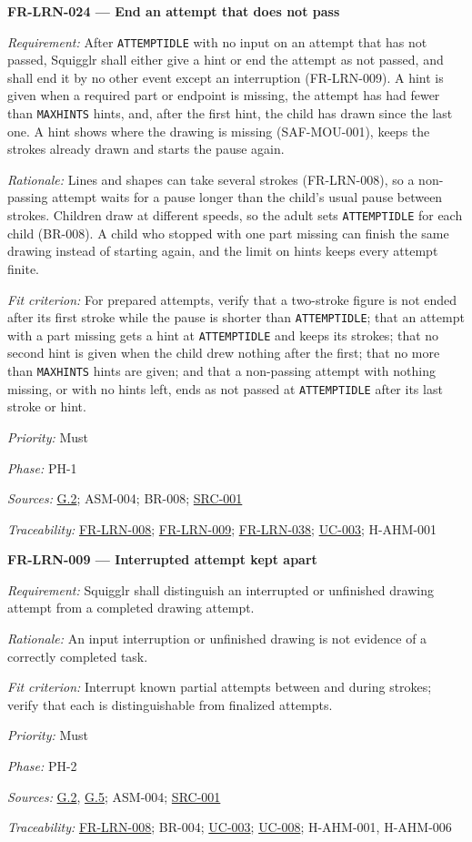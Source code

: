 \documentclass[12pt]{article}
\renewcommand{\_}{\textunderscore\allowbreak}%
\newcommand{\goalref}[1]{\hyperref[goal:#1]{G.#1}}
\newcommand{\ucref}[1]{\hyperref[uc:#1]{\mbox{UC-#1}}}
\newenvironment{srsrequirement}[2]{%
  \par\medskip\noindent\phantomsection\label{req:#1}%
  \textbf{#1 --- #2}\par\nobreak\smallskip }{\par\medskip}
\newcommand{\reqfield}[2]{\noindent\textit{#1:} #2\par}
\newcommand{\reqshall}[1]{\reqfield{Requirement}{#1}}
\newcommand{\reqrationale}[1]{\reqfield{Rationale}{#1}}
\newcommand{\reqfit}[1]{\reqfield{Fit criterion}{#1}}
\newcommand{\reqpriority}[1]{\reqfield{Priority}{#1}}
\newcommand{\reqphase}[1]{\reqfield{Phase}{#1}}
\newcommand{\reqsources}[1]{\reqfield{Sources}{#1}}
\newcommand{\reqtraces}[1]{\reqfield{Traceability}{#1}}
\newcommand{\reqref}[1]{\hyperref[req:#1]{#1}}
\newcommand{\srcref}[1]{\hyperref[src:#1]{SRC-#1}}
\providecommand{\ucref}[1]{\hyperref[uc:#1]{UC-#1}}
\begin{document}
\begin{srsrequirement}{FR-LRN-024}{End an attempt that does not pass}
  \reqshall{After \texttt{ATTEMPT\_IDLE} with no input on an attempt that has
not passed, Squigglr shall either give a hint or end the attempt as not passed,
and shall end it by no other event except an interruption (FR-LRN-009). A hint
is given when a required part or endpoint is missing, the attempt has had fewer
than \texttt{MAX\_HINTS} hints, and, after the first hint, the child has drawn
since the last one. A hint shows where the drawing is missing (SAF-MOU-001),
keeps the strokes already drawn and starts the pause again.}
\reqrationale{Lines and shapes can take several strokes (FR-LRN-008), so a
non-passing attempt waits for a pause longer than the child's usual pause
between strokes. Children draw at different speeds, so the adult sets
\texttt{ATTEMPT\_IDLE} for each child (BR-008). A child who stopped with one
part missing can finish the same drawing instead of starting again, and the
limit on hints keeps every attempt finite.} \reqfit{For prepared attempts,
verify that a two-stroke figure is not ended after its first stroke while the
pause is shorter than \texttt{ATTEMPT\_IDLE}; that an attempt with a part
missing gets a hint at \texttt{ATTEMPT\_IDLE} and keeps its strokes; that no
second hint is given when the child drew nothing after the first; that no more
than \texttt{MAX\_HINTS} hints are given; and that a non-passing attempt with
nothing missing, or with no hints left, ends as not passed at
\texttt{ATTEMPT\_IDLE} after its last stroke or hint.}
  \reqpriority{Must}
  \reqphase{PH-1}
  \reqsources{\goalref{2}; ASM-004; BR-008; \srcref{001}}
  \reqtraces{\reqref{FR-LRN-008}; \reqref{FR-LRN-009}; \reqref{FR-LRN-038};
  \ucref{003}; H-AHM-001}
\end{srsrequirement}

\begin{srsrequirement}{FR-LRN-009}{Interrupted attempt kept apart}
  \reqshall{Squigglr shall distinguish an interrupted or unfinished drawing
attempt from a completed drawing attempt.} \reqrationale{An input interruption
or unfinished drawing is not evidence of a correctly completed task.}
\reqfit{Interrupt known partial attempts between and during strokes; verify that
each is distinguishable from finalized attempts.}
  \reqpriority{Must}
  \reqphase{PH-2}
  \reqsources{\goalref{2}, \goalref{5}; ASM-004; \srcref{001}}
  \reqtraces{\reqref{FR-LRN-008}; BR-004; \ucref{003}; \ucref{008}; H-AHM-001,
  H-AHM-006}
\end{srsrequirement}
\end{document}
